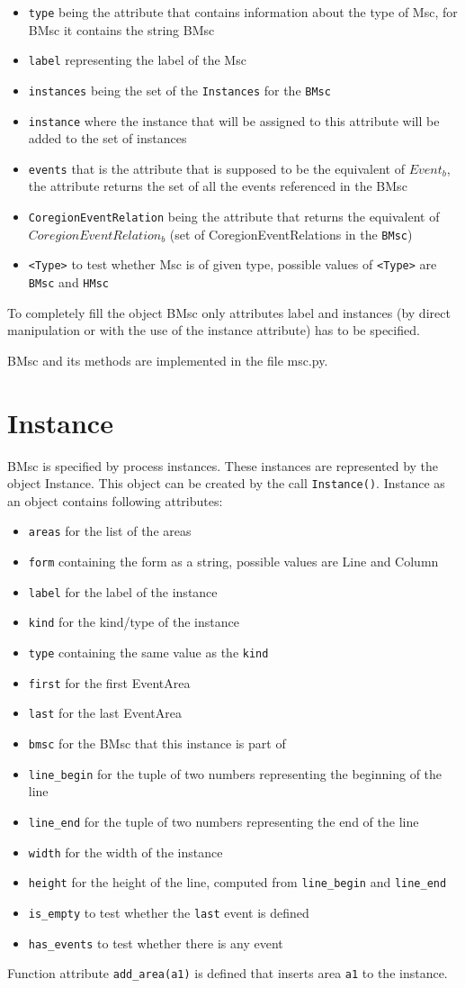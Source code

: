 \documentclass[11pt,oneside]{fithesis2}
\newcommand{\T}[1]{\texttt{#1}}
\newcommand{\ite}[1]{\item{\texttt{#1}}}
\begin{document}
\begin{itemize}
\ite{type} being the attribute that contains information about the type of Msc, for BMsc it contains the string BMsc
\ite{label} representing the label of the Msc
\ite{instances} being the set of the \T{Instances} for the \T{BMsc}
\ite{instance} where the instance that will be assigned to this attribute will be added to the set of instances
\ite{events} that is the attribute that is supposed to be the equivalent of $Event_b$, the attribute returns the set of all the events referenced in the BMsc
\ite{CoregionEventRelation} being the attribute that returns the equivalent of $CoregionEventRelation_b$ (set of CoregionEventRelations in the \T{BMsc})
\ite{<Type>} to test whether Msc is of given type, possible values of \T{<Type>} are \T{BMsc} and \T{HMsc}
\end{itemize}

To completely fill the object BMsc only attributes label and instances (by direct manipulation or with the use of the instance attribute) has to be specified.

BMsc and its methods are implemented in the file msc.py.


\section{Instance}
BMsc is specified by process instances. These instances are represented by the object Instance. This object can be created by the call \T{Instance()}. Instance as an object contains following attributes:
\begin{itemize}
\ite{areas} for the list of the areas
\ite{form} containing the form as a string, possible values are Line and Column
\ite{label} for the label of the instance
\ite{kind} for the kind/type of the instance
\ite{type} containing the same value as the \T{kind}
\ite{first} for the first EventArea
\ite{last} for the last EventArea
\ite{bmsc} for the BMsc that this instance is part of
\ite{line\_begin} for the tuple of two numbers representing the beginning of the line
\ite{line\_end} for the tuple of two numbers representing the end of the line
\ite{width} for the width of the instance
\ite{height} for the height of the line, computed from \texttt{line\_begin} and \texttt{line\_end}
\ite{is\_empty} to test whether the \texttt{last} event is defined
\ite{has\_events} to test whether there is any event
\end{itemize}

Function attribute \texttt{add\_area(a1)} is defined that inserts area \texttt{a1} to the instance.
\end{document}
